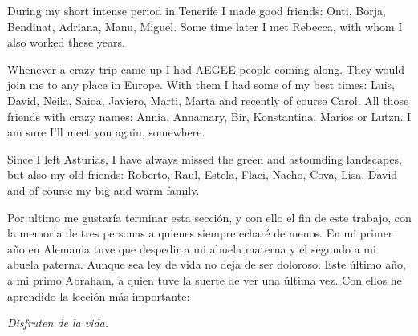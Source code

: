 During my short intense period in Tenerife I made good friends: Onti, Borja, Bendinat, Adriana, Manu, Miguel. Some time later I met Rebecca, with whom I also worked these years.

Whenever a crazy trip came up I had AEGEE people coming along. They would join me to any place in Europe. With them I had some of my best times: Luis, David, Neila, Saioa, Javiero, Marti, Marta and recently of course Carol. All those friends with crazy names: Annia, Annamary, Bir, Konstantina, Marios or Lutzn. I am sure I'll meet you again, somewhere.

Since I left Asturias, I have always missed the green and astounding landscapes, but also my old friends: Roberto, Raul, Estela, Flaci, Nacho, Cova, Lisa, David and of course my big and warm family.

Por ultimo me gustar\'ia terminar esta secci\'on, y con ello el fin de este trabajo, con la memoria de tres personas a quienes siempre echar\'e de menos. En mi primer a\~no en Alemania tuve que despedir a  mi abuela materna y el segundo a mi abuela paterna. Aunque sea ley de vida no deja de ser doloroso. Este \'ultimo a\~no, a mi primo Abraham, a quien tuve la suerte de ver una \'ultima vez. Con ellos he aprendido la lecci\'on m\'as importante:

\vspace{1cm}
{\emph{ \centering Disfruten de la vida.}}



